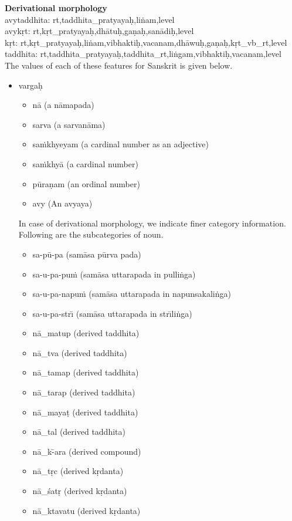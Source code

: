 \documentclass{llncs}
\begin{document}
\noindent 
\textbf {Derivational morphology}\\
avytaddhita: rt,taddhita\_pratyaya\d{h},li\.{n}am,level \\
avyk\d{r}t: rt,k\d{r}t\_pratyaya\d{h},dh{\=a}tu\d{h},ga\d{n}a\d{h},san{\=a}di\d{h},level \\
k\d{r}t:  rt,k\d{r}t\_pratyaya\d{h},li\.{n}am,vibhakti\d{h},vacanam,dh{\=a}wu\d{h},ga\d{n}a\d{h},k\d{r}t\_vb\_rt,level\\
taddhita: rt,taddhita\_pratyaya\d{h},taddhita\_rt,li\.{n}gam,vibhakti\d{h},vacanam,level\\

\noindent 
The values of each of these features for Sanskrit is given below.\\
\begin{itemize}
\item varga\d{h}
\begin{itemize}
\item n{\=a} (a n{\=a}mapada)
\item sarva (a sarvan{\=a}ma)
\item sa\.mkhyeyam (a cardinal number as an adjective)
\item sa\.mkhy{\=a} (a cardinal number)
\item p{\=u}ra\d{n}am (an ordinal number)
\item avy  (An avyaya)
\end{itemize}
In case of derivational morphology, we indicate finer category information. Following are the subcategories of noun.
\begin{itemize}
\item sa-p{\=u}-pa  (sam{\=a}sa p{\=u}rva pada)
\item sa-u-pa-pu\.{m} (sam{\=a}sa uttarapada in pulli\.{n}ga)
\item sa-u-pa-napu\.{m} (sam{\=a}sa uttarapada in napunsakali\.{n}ga)
\item sa-u-pa-str{\=\i} (sam{\=a}sa uttarapada in str{\=\i}li\.{n}ga)
\item n{\=a}\_matup (derived taddhita)
\item n{\=a}\_tva (derived taddhita)
\item n{\=a}\_tamap (derived taddhita)
\item n{\=a}\_tarap (derived taddhita)
\item n{\=a}\_maya\d{t} (derived taddhita)
\item n{\=a}\_tal (derived taddhita)
\item n{\=a}\_k{\=-a}ra (derived compound)
\item n{\=a}\_t\d{r}c (derived k\d{r}danta)
\item n{\=a}\_\'{s}at\d{r} (derived k\d{r}danta)
\item n{\=a}\_ktavatu (derived k\d{r}danta)
\end{itemize}


\end{itemize}
\end{document}
